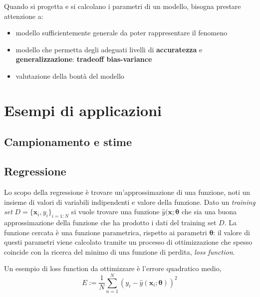 {\color{red}
\vspace{10pt}
\noindent
Quando si progetta e si calcolano i parametri di un modello, bisogna prestare attenzione a:
\begin{itemize}
    \item modello sufficientemente generale da poter rappresentare il fenomeno
    \item modello che permetta degli adeguati livelli di \textbf{accuratezza} e \textbf{generalizzazione}: \textbf{tradeoff bias-variance}
    \item valutazione della bontà del modello
\end{itemize}
}

\chapter{Esempi di applicazioni}
\section{Campionamento e stime}

\section{Regressione}
Lo scopo della regressione è trovare un'approssimazione di una funzione, noti un insieme di valori di variabili indipendenti e valore della funzione. Dato un \textit{training set} $ D = \{ \mathbf{x}_i, y_i\}_{i=1:N}$ si vuole trovare una funzione $\hat{y}(\mathbf{x}; \boldsymbol{\theta}$ che sia una buona approssimazione della funzione che ha prodotto i dati del training set $D$. La funzione cercata è una funzione parametrica, rispetto ai parametri $\boldsymbol{\theta}$: il valore di questi parametri viene calcolato tramite un processo di ottimizzazione che spesso coincide con la ricerca del minimo di una funzione di perdita, \textit{loss function}.

\noindent
Un esempio di loss function da ottimizzare è l'errore quadratico medio,
\begin{equation}
    E := \dfrac{1}{N} \sum_{n=1}^{N} \left( y_i - \hat{y}(\mathbf{x}_i; \boldsymbol{\theta}) \right)^2
\end{equation}

